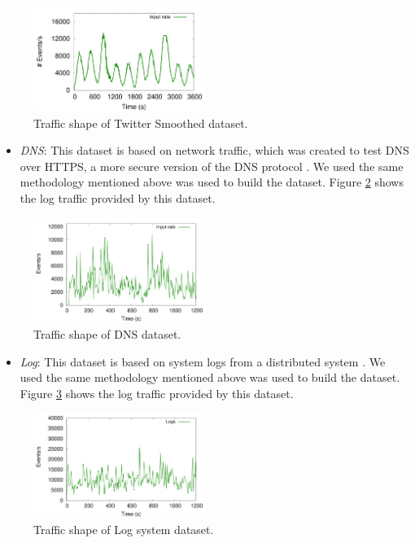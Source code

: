\begin{itemize}
\begin{figure}[!ht]
\centering
    \includegraphics[width=0.5\textwidth]{figures/exp/Dataset-TwitterSmoothed.pdf}
    \caption{Traffic shape of Twitter Smoothed dataset.}
    \label{fig:exp-dataset-twitter-smoothed}
\end{figure}

\end{itemize}

\begin{itemize}
\item \textit{DNS}:  This dataset is based on network traffic, which was created to test DNS over HTTPS, a more secure version of the DNS protocol \citep{MontazeriShatoori20}. We used the same methodology mentioned above was used to build the dataset. Figure \ref{fig:exp-dataset-dns} shows the log traffic provided by this dataset.
\end{itemize}

\begin{figure}[!ht]
\centering
    \includegraphics[width=0.5\textwidth]{figures/exp/Dataset-DNS.pdf}
    \caption{Traffic shape of DNS dataset.}
    \label{fig:exp-dataset-dns}
\end{figure}

\begin{itemize}
\item \textit{Log}: This dataset is based on system logs from a distributed system  \citep{LogsPaper}. We used the same methodology mentioned above was used to build the dataset. Figure \ref{fig:exp-dataset-log} shows the log traffic provided by this dataset.
\end{itemize}

\begin{figure}[!ht]
\centering
    \includegraphics[width=0.5\textwidth]{figures/exp/Dataset-Logs.pdf}
    \caption{Traffic shape of Log system dataset.}
    \label{fig:exp-dataset-log}
\end{figure}

